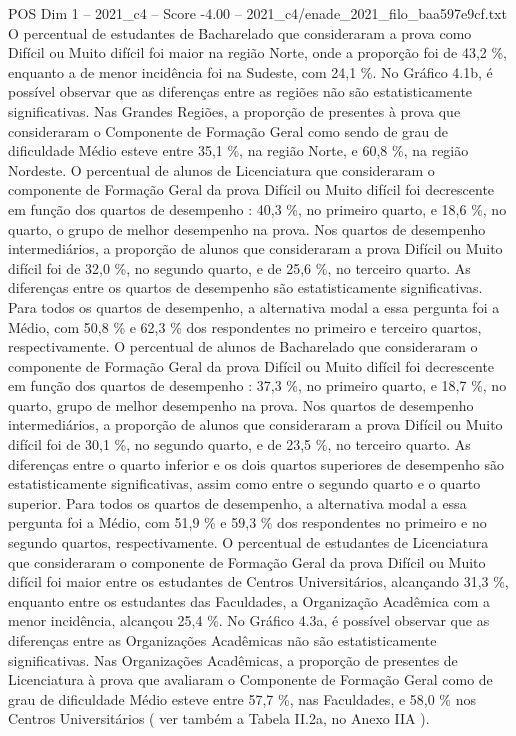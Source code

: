 \begin{textsample}{POS Dim 1 – 2021\_c4 – Score -4.00 – 2021\_c4/enade\_2021\_filo\_baa597e9cf.txt}
O percentual de estudantes de Bacharelado que consideraram a prova como Difícil ou Muito difícil foi maior na região Norte, onde a proporção foi de 43,2 \%, enquanto a de menor incidência foi na Sudeste, com 24,1 \%.
No Gráfico 4.1b, é possível observar que as diferenças entre as regiões não são estatisticamente significativas.
Nas Grandes Regiões, a proporção de presentes à prova que consideraram o Componente de Formação Geral como sendo de grau de dificuldade Médio esteve entre 35,1 \%, na região Norte, e 60,8 \%, na região Nordeste.
O percentual de alunos de Licenciatura que consideraram o componente de Formação Geral da prova Difícil ou Muito difícil foi decrescente em função dos quartos de desempenho : 40,3 \%, no primeiro quarto, e 18,6 \%, no quarto, o grupo de melhor desempenho na prova.
Nos quartos de desempenho intermediários, a proporção de alunos que consideraram a prova Difícil ou Muito difícil foi de 32,0 \%, no segundo quarto, e de 25,6 \%, no terceiro quarto.
As diferenças entre os quartos de desempenho são estatisticamente significativas.
Para todos os quartos de desempenho, a alternativa modal a essa pergunta foi a Médio, com 50,8 \% e 62,3 \% dos respondentes no primeiro e terceiro quartos, respectivamente.
O percentual de alunos de Bacharelado que consideraram o componente de Formação Geral da prova Difícil ou Muito difícil foi decrescente em função dos quartos de desempenho : 37,3 \%, no primeiro quarto, e 18,7 \%, no quarto, grupo de melhor desempenho na prova.
Nos quartos de desempenho intermediários, a proporção de alunos que consideraram a prova Difícil ou Muito difícil foi de 30,1 \%, no segundo quarto, e de 23,5 \%, no terceiro quarto.
As diferenças entre o quarto inferior e os dois quartos superiores de desempenho são estatisticamente significativas, assim como entre o segundo quarto e o quarto superior.
Para todos os quartos de desempenho, a alternativa modal a essa pergunta foi a Médio, com 51,9 \% e 59,3 \% dos respondentes no primeiro e no segundo quartos, respectivamente.
O percentual de estudantes de Licenciatura que consideraram o componente de Formação Geral da prova Difícil ou Muito difícil foi maior entre os estudantes de Centros Universitários, alcançando 31,3 \%, enquanto entre os estudantes das Faculdades, a Organização Acadêmica com a menor incidência, alcançou 25,4 \%.
No Gráfico 4.3a, é possível observar que as diferenças entre as Organizações Acadêmicas não são estatisticamente significativas.
Nas Organizações Acadêmicas, a proporção de presentes de Licenciatura à prova que avaliaram o Componente de Formação Geral como de grau de dificuldade Médio esteve entre 57,7 \%, nas Faculdades, e 58,0 \% nos Centros Universitários ( ver também a Tabela II.2a, no Anexo IIA ).

\end{textsample}
